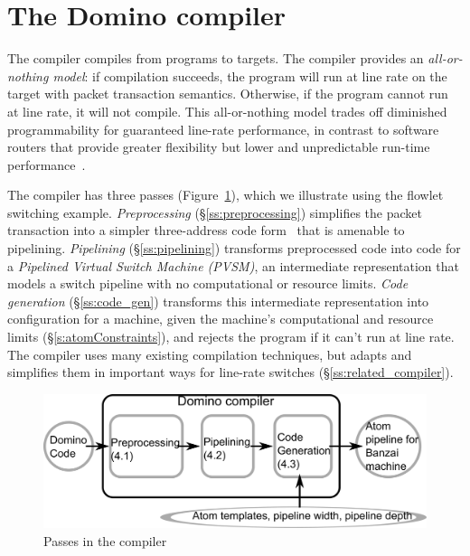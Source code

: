 \section{The Domino compiler}
\label{s:compiler}

The \pktlanguage compiler compiles from \pktlanguage programs to \absmachine
targets. The compiler provides an {\em all-or-nothing model}: if compilation
succeeds, the program will run at line rate on the target with packet
transaction semantics. Otherwise, if the program cannot run at line rate, it
will not compile. This all-or-nothing model trades off diminished
programmability for guaranteed line-rate performance, in contrast to software
routers that provide greater flexibility but lower and unpredictable run-time
performance~\cite{dobrescu2012}.

The \pktlanguage compiler has three passes (Figure~\ref{fig:passes}), which we
illustrate using the flowlet switching example.  \textit{Preprocessing}
(\S\ref{ss:preprocessing}) simplifies the packet transaction into a simpler
three-address code form~\cite{tac} that is amenable to pipelining.
\textit{Pipelining} (\S\ref{ss:pipelining}) transforms preprocessed code into
code for a \textit{Pipelined Virtual Switch Machine (PVSM)}, an intermediate
representation that models a switch pipeline with no computational or resource
limits. \textit{Code generation} (\S\ref{ss:code_gen}) transforms this
intermediate representation into configuration for a \absmachine machine, given
the machine's computational and resource limits (\S\ref{s:atomConstraints}),
and rejects the program if it can't run at line rate.  The \pktlanguage
compiler uses many existing compilation techniques, but adapts and simplifies
them in important ways for line-rate switches (\S\ref{ss:related_compiler}).

\begin{figure}[!t]
  \includegraphics[width=\columnwidth]{compiler.pdf}
  \caption{Passes in the \pktlanguage compiler}
  \label{fig:passes}
\end{figure}

